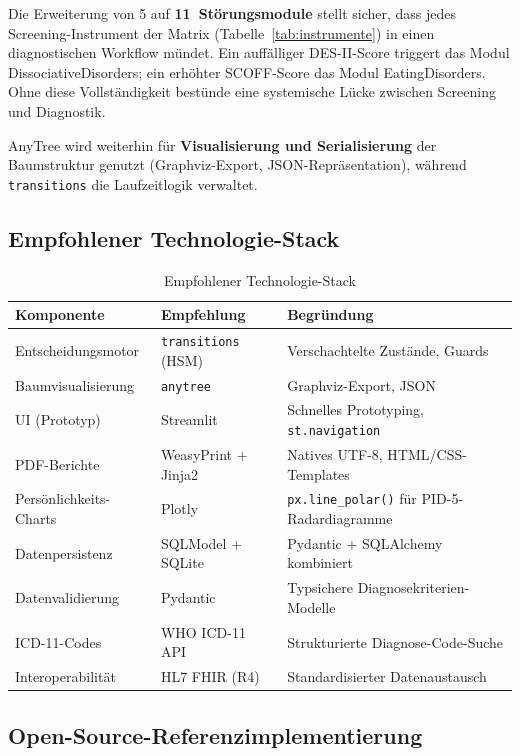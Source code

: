 \documentclass[11pt,a4paper]{article}
\begin{document}
Die Erweiterung von 5 auf \textbf{11~St\"orungsmodule} stellt sicher, dass jedes Screening-Instrument der Matrix (Tabelle~\ref{tab:instrumente}) in einen diagnostischen Workflow m\"undet. Ein auff\"alliger DES-II-Score triggert das Modul DissociativeDisorders; ein erh\"ohter SCOFF-Score das Modul EatingDisorders. Ohne diese Vollst\"andigkeit bestünde eine systemische L\"ucke zwischen Screening und Diagnostik.

AnyTree wird weiterhin f\"ur \textbf{Visualisierung und Serialisierung} der Baumstruktur genutzt (Graphviz-Export, JSON-Repr\"asentation), w\"ahrend \texttt{transitions} die Laufzeitlogik verwaltet.

\subsection{Empfohlener Technologie-Stack}

\begin{table}[H]
\centering
\caption{Empfohlener Technologie-Stack}
\label{tab:techstack}
\begin{tabularx}{\textwidth}{lXl}
\toprule
\textbf{Komponente} & \textbf{Empfehlung} & \textbf{Begr\"undung} \\
\midrule
Entscheidungsmotor & \texttt{transitions} (HSM) & Verschachtelte Zust\"ande, Guards \\
Baumvisualisierung & \texttt{anytree} & Graphviz-Export, JSON \\
UI (Prototyp) & Streamlit & Schnelles Prototyping, \texttt{st.navigation} \\
PDF-Berichte & WeasyPrint + Jinja2 & Natives UTF-8, HTML/CSS-Templates \\
Pers\"onlichkeits-Charts & Plotly & \texttt{px.line\_polar()} f\"ur PID-5-Radardiagramme \\
Datenpersistenz & SQLModel + SQLite & Pydantic + SQLAlchemy kombiniert \\
Datenvalidierung & Pydantic & Typsichere Diagnosekriterien-Modelle \\
ICD-11-Codes & WHO ICD-11 API & Strukturierte Diagnose-Code-Suche \\
Interoperabilit\"at & HL7 FHIR (R4) & Standardisierter Datenaustausch \\
\bottomrule
\end{tabularx}
\end{table}

\subsection{Open-Source-Referenzimplementierung}
\end{document}
